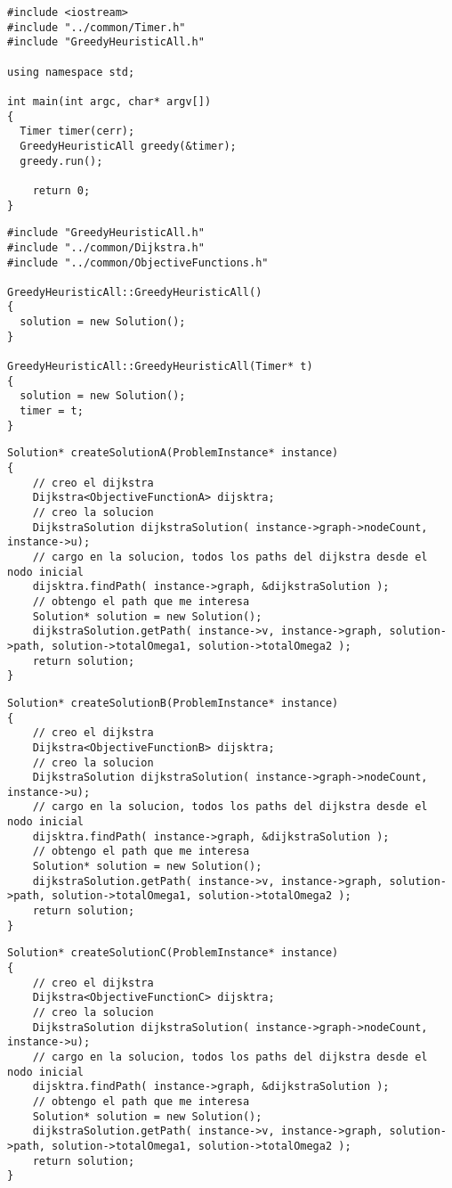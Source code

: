 \begin{lstlisting}[caption=greedy\_heuristic\_All.cpp]
#include <iostream>
#include "../common/Timer.h"
#include "GreedyHeuristicAll.h"

using namespace std;

int main(int argc, char* argv[])
{
  Timer timer(cerr);
  GreedyHeuristicAll greedy(&timer);
  greedy.run(); 
    
    return 0;
}
\end{lstlisting}
\begin{lstlisting}[caption=GreedyHeuristicAll.cpp]
#include "GreedyHeuristicAll.h"
#include "../common/Dijkstra.h"
#include "../common/ObjectiveFunctions.h"

GreedyHeuristicAll::GreedyHeuristicAll()
{
  solution = new Solution();
}

GreedyHeuristicAll::GreedyHeuristicAll(Timer* t)
{
  solution = new Solution();
  timer = t;
}
\end{lstlisting}
\begin{lstlisting}[caption=createSolutionA()]
Solution* createSolutionA(ProblemInstance* instance) 
{    
    // creo el dijkstra
    Dijkstra<ObjectiveFunctionA> dijsktra;
    // creo la solucion
    DijkstraSolution dijkstraSolution( instance->graph->nodeCount, instance->u);
    // cargo en la solucion, todos los paths del dijkstra desde el nodo inicial
    dijsktra.findPath( instance->graph, &dijkstraSolution );
    // obtengo el path que me interesa
    Solution* solution = new Solution();    
    dijkstraSolution.getPath( instance->v, instance->graph, solution->path, solution->totalOmega1, solution->totalOmega2 );
    return solution;
}
\end{lstlisting}
\begin{lstlisting}[caption=createSolutionB()]
Solution* createSolutionB(ProblemInstance* instance) 
{
    // creo el dijkstra    
    Dijkstra<ObjectiveFunctionB> dijsktra;
    // creo la solucion
    DijkstraSolution dijkstraSolution( instance->graph->nodeCount, instance->u);
    // cargo en la solucion, todos los paths del dijkstra desde el nodo inicial
    dijsktra.findPath( instance->graph, &dijkstraSolution );
    // obtengo el path que me interesa
    Solution* solution = new Solution();    
    dijkstraSolution.getPath( instance->v, instance->graph, solution->path, solution->totalOmega1, solution->totalOmega2 );
    return solution;
}
\end{lstlisting}
\begin{lstlisting}[caption=createSolutionC()]
Solution* createSolutionC(ProblemInstance* instance) 
{
    // creo el dijkstra    
    Dijkstra<ObjectiveFunctionC> dijsktra;
    // creo la solucion
    DijkstraSolution dijkstraSolution( instance->graph->nodeCount, instance->u);
    // cargo en la solucion, todos los paths del dijkstra desde el nodo inicial
    dijsktra.findPath( instance->graph, &dijkstraSolution );
    // obtengo el path que me interesa
    Solution* solution = new Solution();    
    dijkstraSolution.getPath( instance->v, instance->graph, solution->path, solution->totalOmega1, solution->totalOmega2 );
    return solution;
}
\end{lstlisting}
